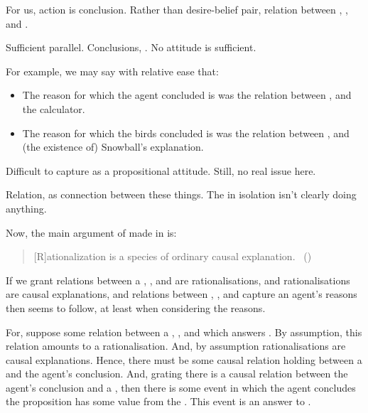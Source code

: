 \begin{note}
  For us, action is conclusion.
  Rather than desire-belief pair, relation between , , and .

  Sufficient parallel.
  Conclusions, \citeauthor{Carroll:1895uj}.
  No attitude is sufficient.

  For example, we may say with relative ease that:

  \begin{itemize}[noitemsep]
  \item
    The reason for which the agent concluded \propM{\gistCalcEq{}} is  was the relation between \propM{\gistCalcEq{}},  and the calculator.
  \item
    The reason for which the birds concluded  is  was the relation between ,   and (the existence of) Snowball's explanation.
  \end{itemize}

  {
    \color{red}
    Difficult to capture as a propositional attitude.
    Still, no real issue here.

    Relation, as connection between these things.
    The \pool{} in isolation isn't clearly doing anything.
  }
\end{note}

\begin{note}
  Now, the main argument of made in  is:
  \begin{quote}
    [R]ationalization is a species of ordinary causal explanation.%
    \mbox{ }\hfill\mbox{(\citeyear[685]{Davidson:1963aa})}
  \end{quote}
  If we grant relations between a , , and  are rationalisations, and rationalisations are causal explanations, and relations between , , and  capture an agent's reasons then \issueInclusion{} seems to follow, at least when considering the \agents{} reasons.

  For, suppose some relation between a , , and \pool{} which answers \qWhy{}.
  By assumption, this relation amounts to a rationalisation.
  And, by assumption rationalisations are causal explanations.
  Hence, there must be some causal relation holding between a  and the agent's conclusion.
  And, grating there is a causal relation between the agent's conclusion and a , then there is some event in which the agent concludes the proposition has some value from the .
  This event is an answer to \qHow{}.
\end{note}

